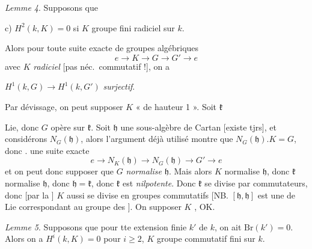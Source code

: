 \documentclass[11pt,a4paper]{article}
\begin{document}
\emph{Lemme 4}. Supposons que \ill{} \struck{\ill{}}

c) $H^2(k,K) = 0$ si $K$ groupe  fini radiciel sur $k$.

Alors pour toute \struck{\ill{}} suite exacte de groupes algébriques
\[
e \to K \to G \to G' \to e
\]
avec $K$ \emph{radiciel} [pas néc.\ commutatif !], on a

$H^1(k,G) \to H^1(k,G')$ \emph{surjectif}.

Par dévissage, on peut supposer $K$ « de hauteur 1 ». Soit $\mathfrak{k}$


Lie, donc $G$ opère sur $\mathfrak{k}$. Soit $\mathfrak{h}$ une
sous-algèbre de Cartan [existe tjrs], et considérons
$N_G(\mathfrak{h})$, alors l'argument déjà utilisé montre que
$N_G(\mathfrak{h}) . K = G$, donc \ill{} \struck{\ill{}} . une suite exacte
\[
e \to N_K(\mathfrak{h}) \to N_G(\mathfrak{h}) \to G' \to e
\]
et on peut donc supposer que $G$ \emph{normalise} $\mathfrak{h}$.
Mais alors $K$ normalise $\mathfrak{h}$, donc $\mathfrak{k}$
normalise $\mathfrak{h}$, donc $\mathfrak{h} = \mathfrak{k}$, donc
$\mathfrak{k}$ est \emph{nilpotente}. Donc $\mathfrak{k}$ se
divise \ill{} par commutateurs, donc [par la  \ill{}
] $K$ aussi se divise en groupes commutatifs [NB.
$[\mathfrak{h},\mathfrak{h}]$ est une  de Lie \ill{}
correspondant au groupe des ]. On \ill{}
\ill{} supposer $K$ , OK.




\emph{Lemme 5}. Supposons que pour tte  extension
 finie $k'$ de $k$, on ait $\mathrm{Br}(k') = 0$. Alors
on a $H^i(k,K) = 0$ pour $i \geq 2$, $K$ groupe commutatif fini sur $k$.
\end{document}
